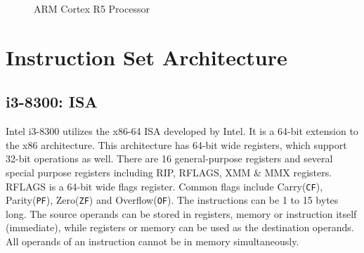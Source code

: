 \documentclass[a4paper,11pt]{article}
\begin{document}
 \begin{figure}[!h]
	\centering
	\hspace{1.5cm}
\caption{ARM Cortex R5 Processor}
\end{figure}
\pagebreak


\section{Instruction Set Architecture}
\subsection{i3-8300: ISA}
Intel i3-8300 utilizes the x86-64 ISA developed by Intel. It is a 64-bit extension to the x86 architecture. This architecture has 64-bit wide registers, which support 32-bit operations as well. There are 16 general-purpose registers and several special purpose registers including RIP, RFLAGS, XMM \& MMX registers. RFLAGS is a 64-bit wide flags register. Common flags include Carry({\tt CF}), Parity({\tt PF}), Zero({\tt ZF}) and Overflow({\tt OF}). The instructions can be 1 to 15 bytes long. The source operands can be stored in registers, memory or instruction itself (immediate), while registers or memory can be used as the destination operands. All operands of an instruction cannot be in memory simultaneously.\\
\end{document}

